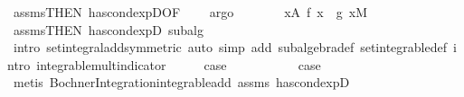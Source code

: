 \begin{isabellebody}
\ assms{\isacharbrackleft}{\kern0pt}THEN\ has{\isacharunderscore}{\kern0pt}cond{\isacharunderscore}{\kern0pt}expD{\isacharparenleft}{\kern0pt}{}{\isacharparenright}{\kern0pt}{\isacharbrackleft}{\kern0pt}OF\ {\isacharunderscore}{\kern0pt}\ {}{\isacharbrackright}{\kern0pt}{\isacharbrackright}{\kern0pt}\ \isamarkupfalse%
\ argo\isanewline
\ \ \isamarkupfalse%
\ \isamarkupfalse%
\ {\isachardoublequoteopen}{\isachardot}{\kern0pt}{\isachardot}{\kern0pt}{\isachardot}{\kern0pt}\ {\isacharequal}{\kern0pt}\ {\isasymintegral}x{\isasymin}A{\isachardot}{\kern0pt}\ {\isacharparenleft}{\kern0pt}f{\isacharprime}{\kern0pt}\ x\ {\isacharplus}{\kern0pt}\ g{\isacharprime}{\kern0pt}\ x{\isacharparenright}{\kern0pt}{\isasympartial}M{\isachardoublequoteclose}\ \isamarkupfalse%
\ assms{\isacharbrackleft}{\kern0pt}THEN\ has{\isacharunderscore}{\kern0pt}cond{\isacharunderscore}{\kern0pt}expD{\isacharparenleft}{\kern0pt}{}{\isacharparenright}{\kern0pt}{\isacharbrackright}{\kern0pt}\ subalg\ {}\ \isamarkupfalse%
\ {\isacharparenleft}{\kern0pt}intro\ set{\isacharunderscore}{\kern0pt}integral{\isacharunderscore}{\kern0pt}add{\isacharparenleft}{\kern0pt}{}{\isacharparenright}{\kern0pt}{\isacharbrackleft}{\kern0pt}symmetric{\isacharbrackright}{\kern0pt}{\isacharcomma}{\kern0pt}\ auto\ simp\ add{\isacharcolon}{\kern0pt}\ subalgebra{\isacharunderscore}{\kern0pt}def\ set{\isacharunderscore}{\kern0pt}integrable{\isacharunderscore}{\kern0pt}def\ intro{\isacharcolon}{\kern0pt}\ integrable{\isacharunderscore}{\kern0pt}mult{\isacharunderscore}{\kern0pt}indicator{\isacharparenright}{\kern0pt}\isanewline
\ \ \isamarkupfalse%
\ \isamarkupfalse%
\ {\isacharquery}{\kern0pt}case\ \isacommand{{\isachardot}{\kern0pt}}\isamarkupfalse%
\isanewline
{}\isamarkupfalse%
\isanewline
\ \ \isamarkupfalse%
\ {}\isanewline
\ \ \isamarkupfalse%
\ \isamarkupfalse%
\ {\isacharquery}{\kern0pt}case\ \isamarkupfalse%
\ {\isacharparenleft}{\kern0pt}metis\ Bochner{\isacharunderscore}{\kern0pt}Integration{\isachardot}{\kern0pt}integrable{\isacharunderscore}{\kern0pt}add\ assms\ has{\isacharunderscore}{\kern0pt}cond{\isacharunderscore}{\kern0pt}expD{\isacharparenleft}{\kern0pt}{}{\isacharparenright}{\kern0pt}{\isacharparenright}{\kern0pt}\isanewline
{}\isamarkupfalse%
\isanewline
\ \ \isamarkupfalse%
\ {}\isanewline

\end{isabellebody}
